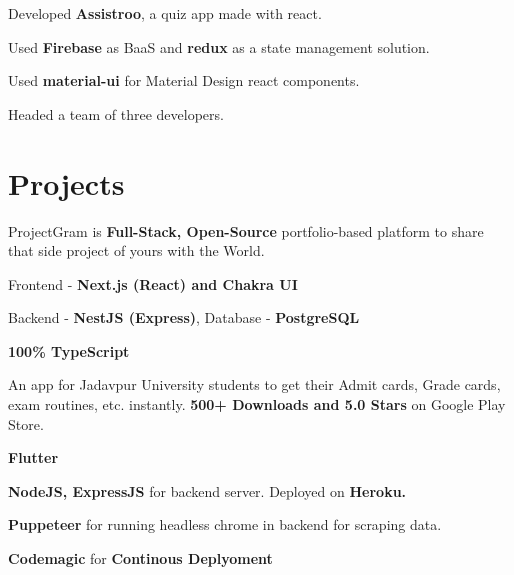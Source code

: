 \documentclass[]{deedy-resume-openfont}
\begin{document}
\begin{minipage}[t]{0.67\textwidth}
\begin{tightemize}
\item Developed \textbf{Assistroo}, a quiz app made with react.
\item Used \textbf{Firebase} as BaaS and \textbf{redux} as a state management solution. 
\item Used \textbf{material-ui} for Material Design react components.
\item Headed a team of three developers.
\end{tightemize}
\sectionsep


\section{Projects}

ProjectGram is \textbf{Full-Stack, Open-Source} portfolio-based platform to share that side project of yours with the World.
\\
\begin{tightemize}
\item Frontend - \textbf{Next.js (React) and Chakra UI }
\item Backend - \textbf {NestJS (Express)}, Database - \textbf {PostgreSQL}
\item \textbf {100\% TypeScript}
\end{tightemize}
\sectionsep



An app for Jadavpur University students to get their Admit cards, Grade cards, exam routines, etc. instantly. \textbf{500+ Downloads and 5.0 Stars} on Google Play Store.\\
\begin{tightemize}
\item \textbf{Flutter}
\item \textbf{NodeJS, ExpressJS} for backend server. Deployed on \textbf{Heroku.}
\item \textbf{Puppeteer} for running headless chrome in backend for scraping data.
\item \textbf{Codemagic} for \textbf{Continous Deplyoment}
\end{tightemize}
\sectionsep



\end{minipage}
\end{document}
